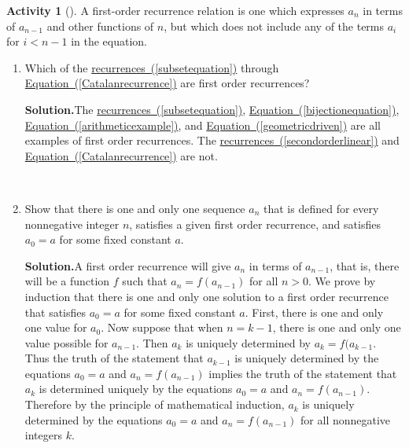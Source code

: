 \documentclass[10pt,]{book}
\theoremstyle{plain}
\theoremstyle{definition}
\newtheorem{activity}[project]{Activity}
\numberwithin{equation}{chapter}
\newcommand{\lt}{<}
\begin{document}
\begin{activity}[]\label{activity-85}
A first-order recurrence relation is one which expresses \(a_n\) in terms of \(a_{n-1}\) and other functions of \(n\), but which does not include any of the terms \(a_i\) for \(i\lt n-1\) in the equation.%
~\par
\begin{enumerate}[label=(\alph*)]
 \item Which of the \hyperref[subsetequation]{recurrences~(\ref{subsetequation})} through \hyperref[Catalanrecurrence]{Equation~(\ref{Catalanrecurrence})} are first order recurrences?%
\par\medskip\noindent%
\textbf{Solution.}\quad The \hyperref[subsetequation]{recurrences~(\ref{subsetequation})}, \hyperref[bijectionequation]{Equation~(\ref{bijectionequation})}, \hyperref[arithmeticexample]{Equation~(\ref{arithmeticexample})}, and \hyperref[geometricdriven]{Equation~(\ref{geometricdriven})} are all examples of first order recurrences. The \hyperref[secondorderlinear]{recurrences~(\ref{secondorderlinear})} and \hyperref[Catalanrecurrence]{Equation~(\ref{Catalanrecurrence})} are not.%

~\par
\item Show that there is one and only one sequence \(a_n\) that is defined for every nonnegative integer \(n\), satisfies a given first order recurrence, and satisfies \(a_0=a\) for some fixed constant \(a\).%
\par\medskip\noindent%
\textbf{Solution.}\quad A first order recurrence will give \(a_n\) in terms of \(a_{n-1}\), that is, there will be a function \(f\) such that \(a_n=f(a_{n-1})\) for all \(n>0\). We prove by induction that there is one and only one solution to a first order recurrence that satisfies \(a_0=a\) for some fixed constant \(a\). First, there is one and only one value for \(a_0\). Now suppose that when \(n=k-1\), there is one and only one value possible for \(a_{n-1}\). Then \(a_k\) is uniquely determined by \(a_k=f(a_{k-1}\). Thus the truth of the statement that \(a_{k-1}\) is uniquely determined by the equations \(a_0=a\) and \(a_n=f(a_{n-1})\) implies the truth of the statement that \(a_k\) is determined uniquely by the equations \(a_0=a\) and \(a_n=f(a_{n-1})\). Therefore by the principle of mathematical induction, \(a_k\) is uniquely determined by the equations \(a_0=a\) and \(a_n=f(a_{n-1})\) for all nonnegative integers \(k\).%

\end{enumerate}
\end{activity}
\end{document}
